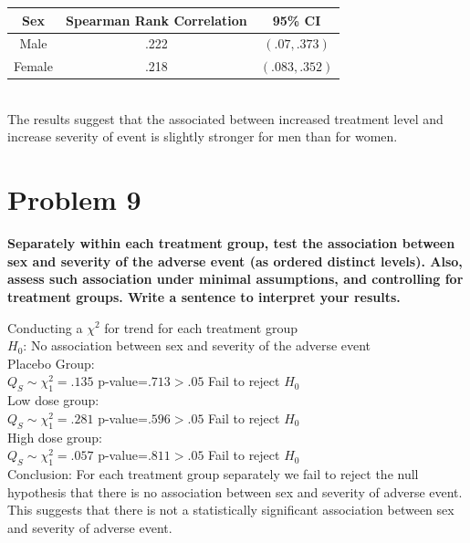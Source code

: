 \documentclass{article}
\begin{document}
\begin{flushleft}
\begin{tabular}{|c|c|c|}
\hline
Sex & Spearman Rank Correlation & 95\% CI\\
\hline
Male&.222 & $(.07,.373)$\\
\hline
Female&.218 & $(.083,.352)$ \\
\hline
\end{tabular}\\
The results suggest that the associated between increased treatment level and increase severity of event is slightly stronger for men than for women.
\pagebreak
\section*{Problem 9}
\textbf{Separately within each treatment group, test the association between sex and severity of the adverse
event (as ordered distinct levels). Also, assess such association under minimal assumptions, and
controlling for treatment groups. Write a sentence to interpret your results.}\medbreak

Conducting a $\chi^2$ for trend for each treatment group\\
$H_0$: No association between sex and severity of the adverse event\\
Placebo Group:\\
$Q_S\sim \chi^2_1= .135$  p-value=$.713>.05$ Fail to reject $H_0$\\
Low dose group:\\
$Q_S\sim \chi^2_1= .281 $  p-value=$.596>.05$ Fail to reject $H_0$\\
High dose group:\\
$Q_S\sim \chi^2_1= .057$  p-value=$.811>.05$ Fail to reject $H_0$\\
Conclusion: For each treatment group separately we fail to reject the null hypothesis that there is no association between sex and severity of adverse event. This suggests that there is not a statistically significant association between sex and severity of adverse event.
\pagebreak

\end{flushleft}
\end{document}
